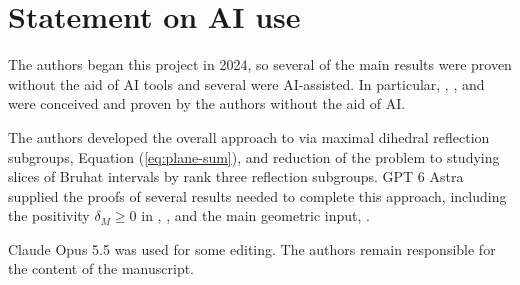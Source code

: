 \documentclass[11pt]{amsart}
\theoremstyle{definition}
\theoremstyle{remark}
\numberwithin{equation}{section}
\begin{document}
\section*{Statement on AI use}
The authors began this project in 2024, so several of the main results were proven without the aid of AI tools and several were AI-assisted. In particular, , , and  were conceived and proven by the authors without the aid of AI.

The authors developed the overall approach to  via maximal dihedral reflection subgroups, Equation (\ref{eq:plane-sum}), and reduction of the problem to studying slices of Bruhat intervals by rank three reflection subgroups. GPT 6 Astra supplied the proofs of several results needed to complete this approach, including the positivity $\delta_M \geq 0$ in , , and the main geometric input, .

Claude Opus 5.5 was used for some editing. The authors remain responsible for the content of the manuscript.




\end{document}
